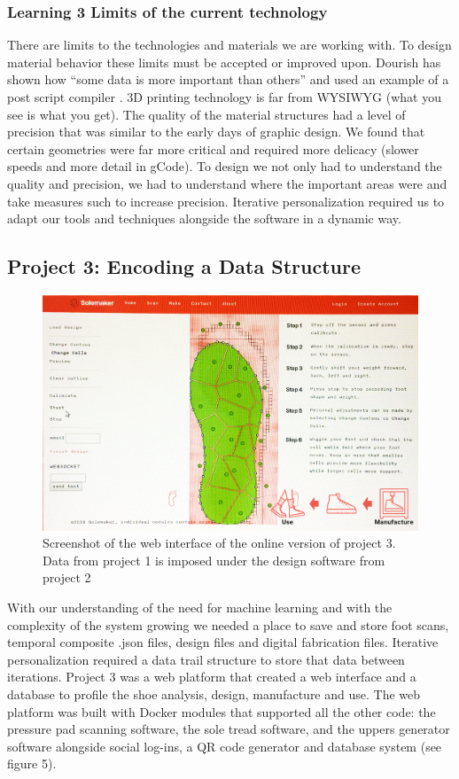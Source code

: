 \subsubsection{Learning 3 Limits of the current technology}

There are limits to the technologies and materials we are working with. To design material behavior these limits must be accepted or improved upon. Dourish has shown how ``some data is more important than others'' and used an example of a post script compiler \cite{Dourish2017}. 3D printing technology is far from WYSIWYG (what you see is what you get). The quality of the material structures had a level of precision that was similar to the early days of graphic design. We found that certain geometries were far more critical and required more delicacy (slower speeds and more detail in gCode). To design we not only had to understand the quality and precision, we had to understand where the important areas were and take measures such to increase precision. Iterative personalization required us to adapt our tools and techniques alongside the software in a dynamic way. 

\subsection{Project 3: Encoding a Data Structure}

\begin{figure}
\includegraphics[width=.5\textwidth]{Solemaker_io}
\caption{Screenshot of the web interface of the online version of project 3. Data from project 1 is imposed under the design software from project 2 }
\label{fig:Project3}
\end{figure}

With our understanding of the need for machine learning and with the complexity of the system growing we needed a place to save and store foot scans, temporal composite .json files, design files and digital fabrication files. Iterative personalization required a data trail structure to store that data between iterations. Project 3 was a web platform that created a web interface and a database to profile the shoe analysis, design, manufacture and use. The web platform was built with Docker modules that supported all the other code: the pressure pad scanning software, the sole tread software, and the uppers generator software alongside social log-ins, a QR code generator and database system (see figure 5). 

